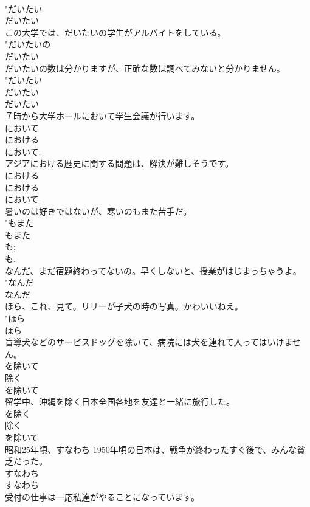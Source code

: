 \documentclass[8pt]{extreport}
\begin{document}
\begin{CJK}{UTF8}{min}
{\\	"だいたい
\\	だいたい 
\\	この大学では、だいたいの学生がアルバイトをしている。	
\\	"だいたいの 
\\	だいたい 
\\	だいたいの数は分かりますが、正確な数は調べてみないと分かりません。	
\\	"だいたい　
\\	だいたい 
\\	だいたい 
\\	７時から大学ホールにおいて学生会議が行います。	
\\	において 
\\	における 
\\	において. 
\\	アジアにおける歴史に関する問題は、解決が難しそうです。	
\\	における 
\\	における 
\\	において. 
\\	暑いのは好きではないが、寒いのもまた苦手だ。	
\\	"もまた 
\\	もまた 
\\	も; 
\\	も.
\\	なんだ、まだ宿題終わってないの。早くしないと、授業がはじまっちゃうよ。	
\\	"なんだ 
\\	なんだ 
\\	ほら、これ、見て。リリーが子犬の時の写真。かわいいねえ。	
\\	"ほら 
\\	ほら 
\\	盲導犬などのサービスドッグを除いて、病院には犬を連れて入ってはいけません。	
\\	を除いて 
\\	除く 
\\	を除いて 
\\	留学中、沖縄を除く日本全国各地を友達と一緒に旅行した。	
\\	を除く 
\\	除く 
\\	を除いて 
\\	昭和25年頃、すなわち 1950年頃の日本は、戦争が終わったすぐ後で、みんな貧乏だった。	
\\	すなわち 
\\	すなわち
\\	受付の仕事は一応私達がやることになっています。	
}
\end{CJK}
\end{document}
